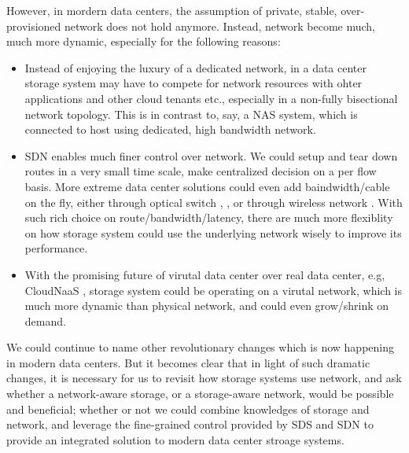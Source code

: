 However, in mordern data centers, the assumption of private, stable, over-provisioned network does not hold anymore. Instead, network become much, much more dynamic, especially for the following reasons:


\begin{itemize}
\item{}
       	Instead of enjoying the luxury of a dedicated network, in a data center storage system may have to compete for network resources with ohter applications and other cloud tenants etc., especially in a non-fully bisectional network topology. This is in contrast to, say, a NAS system, which is connected to host using dedicated, high bandwidth network. 

\item {}
SDN enables much finer control over network. We could setup and tear down routes in a very small time scale, make centralized decision on a per flow basis. More extreme data center solutions could even add baindwidth/cable on the fly, either through optical switch \cite{c-through}, \cite{Hellio}, or through wireless network \cite{flyways}. With such rich choice on route/bandwidth/latency, there are much more flexiblity on how storage system could use the underlying network wisely to improve its performance.

\item {}
With the promising future of virutal data center over real data center, e.g, CloudNaaS \cite{cloud-naas}, storage system could be operating on a virutal network, which is much more dynamic than physical network, and could even grow/shrink on demand.

\end{itemize}

We could continue to name other revolutionary changes which is now happening in modern data centers. But it becomes clear that in light of such dramatic changes, it is necessary for us to revisit how storage systems use network, and ask whether a network-aware storage, or a storage-aware network, would be possible and beneficial; whether or not we could combine knowledges of storage and network, and leverage the fine-grained control provided by SDS and SDN to provide an integrated solution to modern data center stroage systems.


